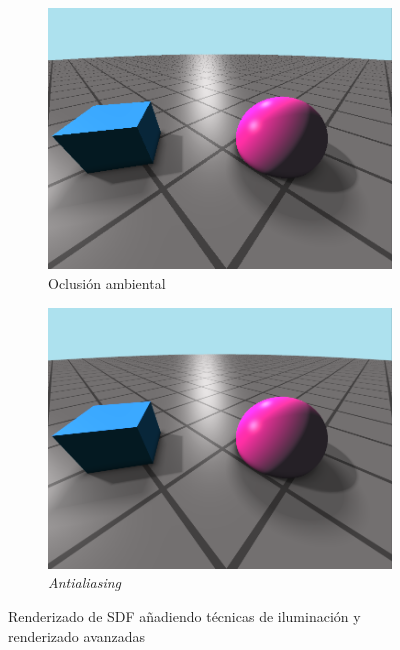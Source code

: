 \begin{figure}[ht!]
\begin{subfigure}[b]{0.45\textwidth}
        \includegraphics[width=\textwidth]{Plantilla-TFG-master/img/escena7_AO.png}
        \caption{Oclusión ambiental}
    \end{subfigure}
    \hfill
    \begin{subfigure}[b]{0.45\textwidth}
        \centering
        \includegraphics[width=\textwidth]{Plantilla-TFG-master/img/escena9_AA3.png}
        \caption{\textit{Antialiasing}}
    \end{subfigure}

    \caption{Renderizado de SDF añadiendo técnicas de iluminación y renderizado avanzadas}
    \label{fig:compFinal}
\end{figure}




